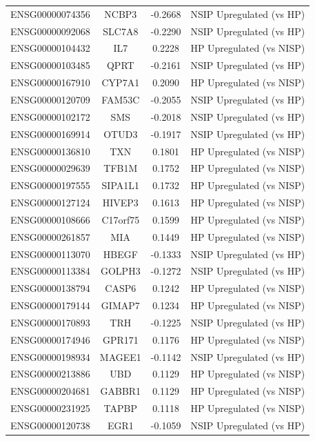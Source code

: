 \documentclass[
]{article}
\begin{document}
\begin{singlespace}
\begin{longtable}[t]{lccc}
\endfoot
\bottomrule
\endlastfoot
ENSG00000074356 & NCBP3 & -0.2668 & NSIP Upregulated (vs HP)\\
ENSG00000092068 & SLC7A8 & -0.2290 & NSIP Upregulated (vs HP)\\
ENSG00000104432 & IL7 & 0.2228 & HP Upregulated (vs NISP)\\
ENSG00000103485 & QPRT & -0.2161 & NSIP Upregulated (vs HP)\\
ENSG00000167910 & CYP7A1 & 0.2090 & HP Upregulated (vs NISP)\\
\addlinespace
ENSG00000120709 & FAM53C & -0.2055 & NSIP Upregulated (vs HP)\\
ENSG00000102172 & SMS & -0.2018 & NSIP Upregulated (vs HP)\\
ENSG00000169914 & OTUD3 & -0.1917 & NSIP Upregulated (vs HP)\\
ENSG00000136810 & TXN & 0.1801 & HP Upregulated (vs NISP)\\
ENSG00000029639 & TFB1M & 0.1752 & HP Upregulated (vs NISP)\\
\addlinespace
ENSG00000197555 & SIPA1L1 & 0.1732 & HP Upregulated (vs NISP)\\
ENSG00000127124 & HIVEP3 & 0.1613 & HP Upregulated (vs NISP)\\
ENSG00000108666 & C17orf75 & 0.1599 & HP Upregulated (vs NISP)\\
ENSG00000261857 & MIA & 0.1449 & HP Upregulated (vs NISP)\\
ENSG00000113070 & HBEGF & -0.1333 & NSIP Upregulated (vs HP)\\
\addlinespace
ENSG00000113384 & GOLPH3 & -0.1272 & NSIP Upregulated (vs HP)\\
ENSG00000138794 & CASP6 & 0.1242 & HP Upregulated (vs NISP)\\
ENSG00000179144 & GIMAP7 & 0.1234 & HP Upregulated (vs NISP)\\
ENSG00000170893 & TRH & -0.1225 & NSIP Upregulated (vs HP)\\
ENSG00000174946 & GPR171 & 0.1176 & HP Upregulated (vs NISP)\\
\addlinespace
ENSG00000198934 & MAGEE1 & -0.1142 & NSIP Upregulated (vs HP)\\
ENSG00000213886 & UBD & 0.1129 & HP Upregulated (vs NISP)\\
ENSG00000204681 & GABBR1 & 0.1129 & HP Upregulated (vs NISP)\\
ENSG00000231925 & TAPBP & 0.1118 & HP Upregulated (vs NISP)\\
ENSG00000120738 & EGR1 & -0.1059 & NSIP Upregulated (vs HP)\\

\end{longtable}
\end{singlespace}
\end{document}
